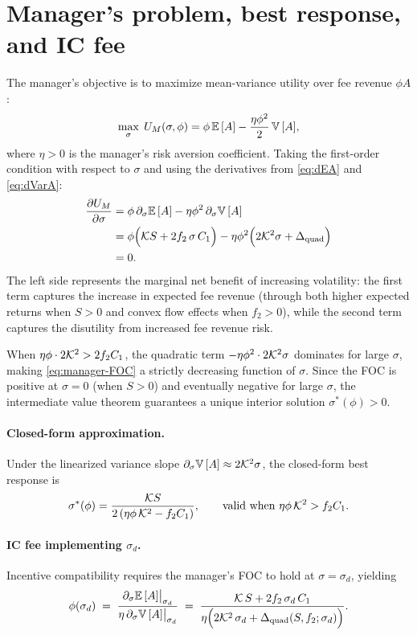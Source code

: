 \section{Manager’s problem, best response, and IC fee}
\label{app:manager-solution}
The manager's objective is to maximize mean-variance utility over fee revenue $\phi A$:
\[
\max_\sigma \; U_M(\sigma,\phi) = \phi\,{\mathbb{E}}\,[A] - \frac{\eta\phi^2}{2}\,{\mathbb{V}}\,[A],
\]
where $\eta>0$ is the manager's risk aversion coefficient. Taking the first-order condition with respect to $\sigma$ and using the derivatives from \eqref{eq:dEA} and \eqref{eq:dVarA}:
\begin{align}
\frac{\partial U_M}{\partial \sigma} &= \phi\,\partial_\sigma {\mathbb{E}}\,[A] - \eta\phi^2\,\partial_\sigma {\mathbb{V}}\,[A] \nonumber\\
&= \phi\Big(\mathcal{K} S + 2 f_2\,\sigma\,C_1\Big) - \eta\phi^2\Big(2\mathcal{K}^2\sigma + \Delta_{\text{quad}}\Big) \nonumber\\
&= 0.\label{eq:manager-FOC}
\end{align}
The left side represents the marginal net benefit of increasing volatility: the first term captures the increase in expected fee revenue (through both higher expected returns when $S>0$ and convex flow effects when $f_2>0$), while the second term captures the disutility from increased fee revenue risk.

When $\eta\phi\cdot 2\mathcal{K}^2 > 2f_2 C_1$, the quadratic term $-\eta\phi^2\cdot 2\mathcal{K}^2\sigma$ dominates for large $\sigma$, making \eqref{eq:manager-FOC} a strictly decreasing function of $\sigma$. Since the FOC is positive at $\sigma=0$ (when $S>0$) and eventually negative for large $\sigma$, the intermediate value theorem guarantees a unique interior solution $\sigma^*(\phi)>0$.

\paragraph{Closed-form approximation.}
Under the linearized variance slope $\partial_\sigma {\mathbb{V}}\,[A]\approx 2\mathcal{K}^2\sigma$, the closed-form best response is
\begin{equation}
\label{eq:sigma-star}
\sigma^*(\phi) = \frac{\mathcal{K} S}{2\,(\eta\phi\,\mathcal{K}^2 - f_2 C_1)},\qquad \text{valid when } \eta\phi\,\mathcal{K}^2> f_2 C_1.
\end{equation}

\paragraph{IC fee implementing $\sigma_d$.}
Incentive compatibility requires the manager’s FOC to hold at $\sigma=\sigma_d$, yielding
\begin{equation}
\label{eq:phi-IC}
\phi(\sigma_d)
\;=\;
\frac{\partial_\sigma {\mathbb{E}}\,[A]\big|_{\sigma_d}}
{\eta\,\partial_\sigma {\mathbb{V}}\,[A]\big|_{\sigma_d}}
\;=\;
\frac{\mathcal{K}\,S + 2 f_2 \,\sigma_d\,C_1}
{\eta\Big(2 \mathcal{K}^2 \,\sigma_d + \Delta_{\text{quad}}(S,f_2;\sigma_d)\Big)}.
\end{equation}

